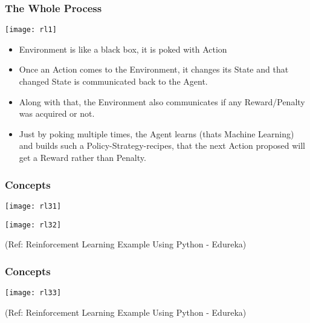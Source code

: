 \begin{frame}[fragile]\frametitle{The Whole Process}

\begin{center}
\texttt{[image: rl1]}
\end{center}

\begin{itemize}
\item Environment is like a black box, it is poked with Action
\item Once an Action comes to the Environment, it changes its State and that changed State is communicated back to the Agent.
\item Along with that, the Environment also communicates if any Reward/Penalty was acquired or not.
\item Just by poking multiple times, the Agent learns (thats Machine Learning) and builds such a Policy-Strategy-recipes, that the next Action proposed will get a Reward rather than Penalty.
\end{itemize}
\end{frame}


\begin{frame}[fragile]\frametitle{Concepts}
\begin{center}
\texttt{[image: rl31]}

\texttt{[image: rl32]}

\end{center}

{\tiny (Ref: Reinforcement Learning Example Using Python - Edureka)}

\end{frame}

\begin{frame}[fragile]\frametitle{Concepts}
\begin{center}
\texttt{[image: rl33]}

\end{center}

{\tiny (Ref: Reinforcement Learning Example Using Python - Edureka)}

\end{frame}

